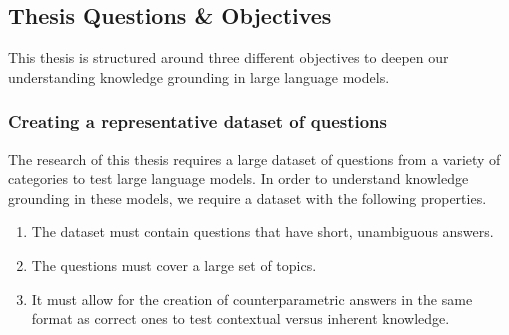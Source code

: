 \newpage{}

\subsection{Thesis Questions \& Objectives}

This thesis is structured around three different objectives to deepen our understanding knowledge grounding in large language models.


\subsubsection{Creating a representative dataset of questions}
\label{questions_objective}

The research of this thesis requires a large dataset of questions from a variety of categories to test large language models.
In order to understand knowledge grounding in these models, we require a dataset with the following properties.
\begin{enumerate}
	\item The dataset must contain questions that have short, unambiguous answers.
	\item The questions must cover a large set of topics.
	\item It must allow for the creation of counterparametric answers in the same format as correct ones to test contextual versus inherent knowledge.
\end{enumerate}

